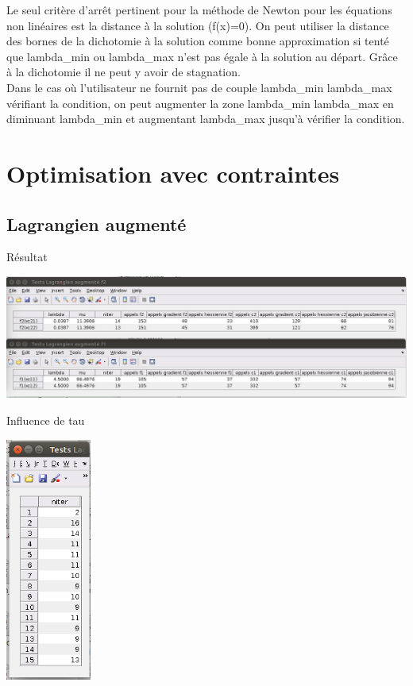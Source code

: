 \documentclass[a4paper,12pt]{article}
\begin{document}
\clearpage
Le seul critère d'arrêt pertinent pour la méthode de Newton pour les équations non linéaires est la distance à la solution (f(x)=0). On peut utiliser la distance des bornes de la dichotomie à la solution comme bonne approximation si tenté que lambda\_min ou lambda\_max n'est pas égale à la solution au départ. Grâce à la dichotomie il ne peut y avoir de stagnation.\\

Dans le cas où l'utilisateur ne fournit pas de couple lambda\_min lambda\_max vérifiant la condition, on peut augmenter la zone lambda\_min lambda\_max en diminuant lambda\_min et augmentant lambda\_max jusqu'à vérifier la condition.\\


\section{Optimisation avec contraintes}

\subsection{Lagrangien augmenté}

Résultat

\begin{center}
\includegraphics[width=14cm]{q5.png}
\end{center}

Influence de tau

\begin{center}
\includegraphics[height=8cm]{q6.png}
\end{center}
\end{document}
